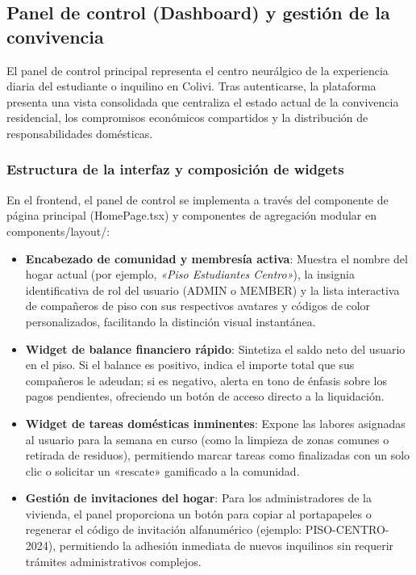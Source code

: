 \subsection{Panel de control (Dashboard) y gestión de la convivencia}
\label{subsec:dashboard_convivencia}

El panel de control principal representa el centro neurálgico de la experiencia diaria del estudiante o inquilino en Colivi. Tras autenticarse, la plataforma presenta una vista consolidada que centraliza el estado actual de la convivencia residencial, los compromisos económicos compartidos y la distribución de responsabilidades domésticas.

\subsubsection{Estructura de la interfaz y composición de widgets}

En el frontend, el panel de control se implementa a través del componente de página principal (HomePage.tsx) y componentes de agregación modular en components/layout/:

\begin{itemize}
    \item \textbf{Encabezado de comunidad y membresía activa}: Muestra el nombre del hogar actual (por ejemplo, \emph{«Piso Estudiantes Centro»}), la insignia identificativa de rol del usuario (ADMIN o MEMBER) y la lista interactiva de compañeros de piso con sus respectivos avatares y códigos de color personalizados, facilitando la distinción visual instantánea.
    \item \textbf{Widget de balance financiero rápido}: Sintetiza el saldo neto del usuario en el piso. Si el balance es positivo, indica el importe total que sus compañeros le adeudan; si es negativo, alerta en tono de énfasis sobre los pagos pendientes, ofreciendo un botón de acceso directo a la liquidación.
    \item \textbf{Widget de tareas domésticas inminentes}: Expone las labores asignadas al usuario para la semana en curso (como la limpieza de zonas comunes o retirada de residuos), permitiendo marcar tareas como finalizadas con un solo clic o solicitar un «rescate» gamificado a la comunidad.
    \item \textbf{Gestión de invitaciones del hogar}: Para los administradores de la vivienda, el panel proporciona un botón para copiar al portapapeles o regenerar el código de invitación alfanumérico (ejemplo: PISO-CENTRO-2024), permitiendo la adhesión inmediata de nuevos inquilinos sin requerir trámites administrativos complejos.
\end{itemize}

